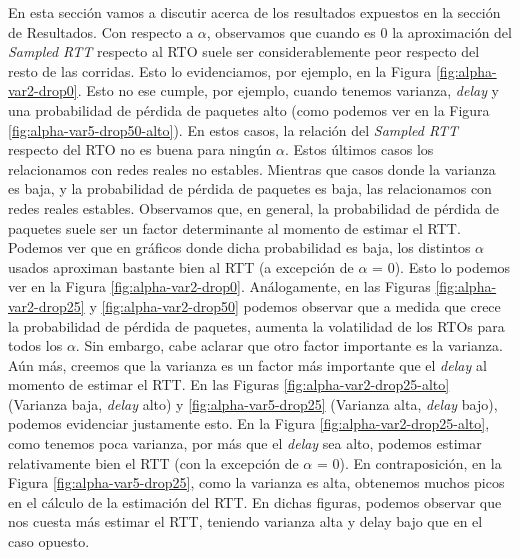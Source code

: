 En esta sección vamos a discutir acerca de los resultados expuestos en la sección de Resultados.
%
Con respecto a $\alpha$, observamos que cuando es 0 la aproximación del \emph{Sampled RTT} respecto al RTO suele ser considerablemente peor respecto del resto de las corridas. Esto lo evidenciamos, por ejemplo, en la Figura \ref{fig:alpha-var2-drop0}.
Esto no ese cumple, por ejemplo, cuando tenemos varianza, \emph{delay} y una probabilidad de pérdida de paquetes alto (como podemos ver en la Figura \ref{fig:alpha-var5-drop50-alto}). En estos casos, la relación del \emph{Sampled RTT} respecto del RTO no es buena para ningún $\alpha$.
Estos últimos casos los relacionamos con redes reales no estables. Mientras que casos donde la varianza es baja, y la probabilidad de pérdida de paquetes es baja, las relacionamos con redes reales estables.
Observamos que, en general, la probabilidad de pérdida de paquetes suele ser un factor determinante al momento de estimar el RTT. Podemos ver que en gráficos donde dicha probabilidad es baja, los distintos $\alpha$ usados aproximan bastante bien al RTT (a excepción de $\alpha$ = 0). Esto lo podemos ver en la Figura \ref{fig:alpha-var2-drop0}.
Análogamente, en las Figuras \ref{fig:alpha-var2-drop25} y \ref{fig:alpha-var2-drop50} podemos observar que a medida que crece la probabilidad de pérdida de paquetes, aumenta la volatilidad de los RTOs para todos los $\alpha$.
Sin embargo, cabe aclarar que otro factor importante es la varianza. Aún más, creemos que la varianza es un factor más importante que el \emph{delay} al momento de estimar el RTT. En las Figuras \ref{fig:alpha-var2-drop25-alto} (Varianza baja, \emph{delay} alto) y \ref{fig:alpha-var5-drop25} (Varianza alta, \emph{delay} bajo), podemos evidenciar justamente esto.
En la Figura \ref{fig:alpha-var2-drop25-alto}, como tenemos poca varianza, por más que el \emph{delay} sea alto, podemos estimar relativamente bien el RTT (con la excepción de $\alpha$ = 0). En contraposición, en la Figura \ref{fig:alpha-var5-drop25}, como la varianza es alta, obtenemos muchos picos en el cálculo de la estimación del RTT. En dichas figuras, podemos observar que nos cuesta más estimar el RTT, teniendo varianza alta y delay bajo que en el caso opuesto.
